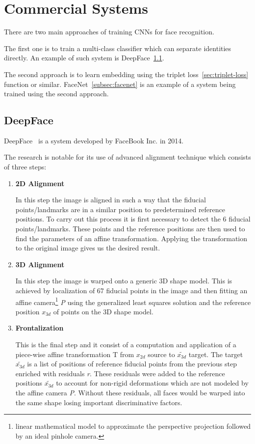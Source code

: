\section{Commercial Systems}\label{sec:systems}
There are two main approaches of training CNNs for face recognition.

The first one is to train a multi-class classifier which can separate identities directly.
An example of such system is DeepFace~\ref{subsec:deepface}.

The second approach is to learn embedding using the triplet loss~\ref{sec:triplet-loss} function or similar.
FaceNet~\ref{subsec:facenet} is an example of a system being trained using the second approach.

\subsection{DeepFace}\label{subsec:deepface}
DeepFace~\cite{DeepFace} is a system developed by FaceBook Inc. in 2014.

The research is notable for its use of advanced alignment technique which consists of three steps:

\begin{enumerate}
    \item \textbf{2D Alignment}

    In this step the image is aligned in such a way that the fiducial points/landmarks are in a similar position
    to predetermined reference positions.
    To carry out this process it is first necessary to detect the 6 fiducial points/landmarks.
    These points and the reference positions are then used to find the parameters of an affine transformation.
    Applying the transformation to the original image gives us the desired result.
    \item \textbf{3D Alignment}

    In this step the image is warped onto a generic 3D shape model.
    This is achieved by localization of 67 fiducial points in the image and then fitting an affine
    camera\footnote{linear mathematical model to approximate the perspective projection followed by an ideal
    pinhole camera.} \textit{P} using the generalized least squares solution and the reference position $x_{3d}$ of
    points on the 3D shape model.

    \item \textbf{Frontalization}

    This is the final step and it consist of a computation and application of a piece-wise affine transformation T from
    $x_{2d}$ source to $\tilde{x_{3d}}$ target.
    The target $\tilde{x_{3d}}$ is a list of positions of reference fiducial points from the previous step enriched with
    residuals \textit{r}.
    These residuals were added to the reference positions $\tilde{x_{3d}}$ to account for non-rigid deformations which
    are not modeled by the affine camera \textit{P}.
    Without these residuals, all faces would be warped into the same shape losing important discriminative factors.
\end{enumerate}

